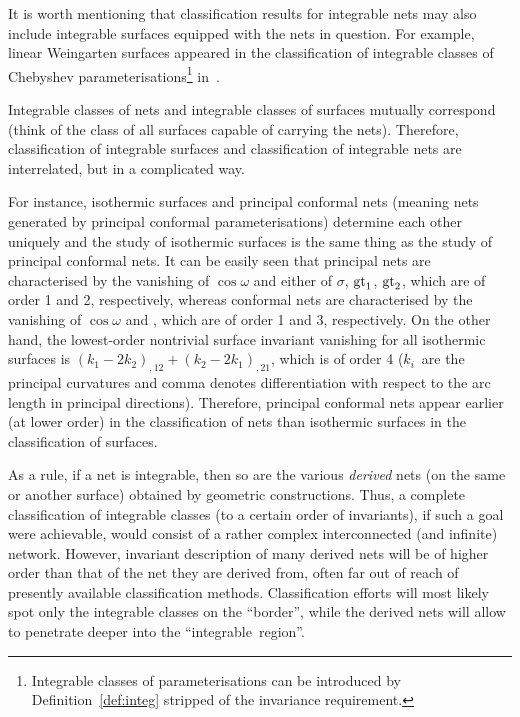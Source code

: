 \documentclass[pdftex]{sigma}
\def\gc#1{{\mathop{\rm gc}}_{#1}}
\def\gtor#1{{{\rm gt}}_{#1}}
\numberwithin{equation}{section}
\begin{document}
It is worth mentioning that classification results for integrable nets may also include
integrable surfaces equipped with the nets in question.
For example, linear Weingarten surfaces appeared in the classification
of integrable classes of Chebyshev parameterisations\footnote{Integrable classes
of parameterisations can be introduced by Definition~\ref{def:integ} stripped of the
invariance requirement.} in~\cite[Section~2]{K-M}.

\begin{Remark}\label{rem:isotherm}
Integrable classes of nets and integrable classes of surfaces mutually correspond
(think of the class of all surfaces capable of carrying the nets).
Therefore, classification of integrable surfaces and
classification of integrable nets are interrelated, but in a complicated way.

For instance, isothermic surfaces and principal conformal nets
(meaning nets generated by principal conformal parameterisations)
\cite{C-G-S,MT-2017}
determine each other uniquely and
the study of isothermic surfaces is the same thing as the
study of principal conformal nets.
It can be easily seen that principal nets are characterised by the vanishing of
$\cos\omega$ and either of $\sigma$, $\gtor1$,  $\gtor2$, which are of order 1 and 2,
respectively,
whereas conformal nets are characterised by the vanishing of $\cos\omega$
and \smash{$\widehat{X_1}\,\gc1 + \widehat{X_2}\,\gc2$}, which are of order 1 and 3, respectively.
On the other hand, the lowest-order nontrivial surface invariant
vanishing for all isothermic surfaces is
$(k_1  - 2 k_2)_{,12} + (k_2 - 2 k_1)_{,21}$,
which is of order 4
($k_i$~are the principal curvatures and comma denotes
differentiation with respect to the arc length in principal directions).
Therefore, principal conformal nets appear earlier (at lower order)
in the classification of nets than isothermic surfaces in the classification of surfaces.
\end{Remark}

As a rule, if a net is integrable, then so are the various {\it derived} nets
(on the same or another surface) obtained by geometric constructions.
Thus, a complete classification of integrable classes (to a certain order of
invariants), if such a goal were achievable, would consist of a rather complex
interconnected (and infinite) network.
However, invariant description of many derived nets will be of higher order
than that of the net they are derived from,
often far out of reach of presently available classification methods.
Classification efforts will most likely spot only the
integrable classes on the ``border'', while the derived nets will allow to penetrate
deeper into the ``integrable~region''.
\end{document}
